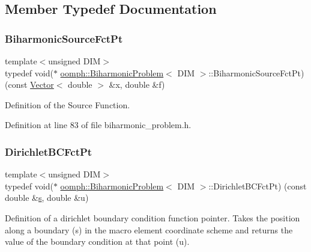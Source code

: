 \subsection{Member Typedef Documentation}
\mbox{\label{classoomph_1_1BiharmonicProblem_a08d7386bbae19862d6fa656b8a2ae2a0}} 
\subsubsection{\texorpdfstring{Biharmonic\+Source\+Fct\+Pt}{BiharmonicSourceFctPt}}
{\footnotesize\ttfamily template$<$unsigned D\+IM$>$ \\
typedef void($\ast$ \hyperlink{classoomph_1_1BiharmonicProblem}{oomph\+::\+Biharmonic\+Problem}$<$ D\+IM $>$\+::Biharmonic\+Source\+Fct\+Pt) (const \hyperlink{classoomph_1_1Vector}{Vector}$<$ double $>$ \&x, double \&f)}



Definition of the Source Function. 



Definition at line 83 of file biharmonic\+\_\+problem.\+h.

\mbox{\label{classoomph_1_1BiharmonicProblem_ac3e873c52bcd489bc545f3cd2c860e8f}} 
\subsubsection{\texorpdfstring{Dirichlet\+B\+C\+Fct\+Pt}{DirichletBCFctPt}}
{\footnotesize\ttfamily template$<$unsigned D\+IM$>$ \\
typedef void($\ast$ \hyperlink{classoomph_1_1BiharmonicProblem}{oomph\+::\+Biharmonic\+Problem}$<$ D\+IM $>$\+::Dirichlet\+B\+C\+Fct\+Pt) (const double \&\hyperlink{cfortran_8h_ab7123126e4885ef647dd9c6e3807a21c}{s}, double \&u)}



Definition of a dirichlet boundary condition function pointer. Takes the position along a boundary (s) in the macro element coordinate scheme and returns the value of the boundary condition at that point (u). 



